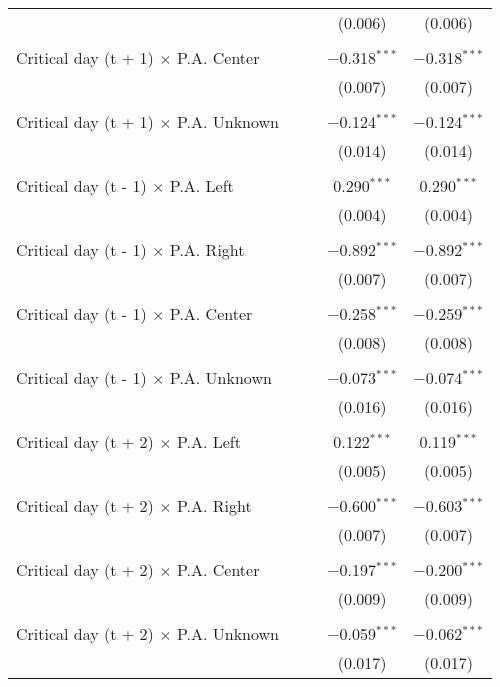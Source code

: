 \documentclass[
]{article}
\begin{document}
\begin{table}[!htbp]
{\begin{tabular}{@{\extracolsep{5pt}}lcccc}
  &  &  & (0.006) & (0.006) \\ 
  & & & & \\ 
 Critical day (t + 1) $\times$ P.A. Center &  &  & $-$0.318$^{***}$ & $-$0.318$^{***}$ \\ 
  &  &  & (0.007) & (0.007) \\ 
  & & & & \\ 
 Critical day (t + 1) $\times$ P.A. Unknown &  &  & $-$0.124$^{***}$ & $-$0.124$^{***}$ \\ 
  &  &  & (0.014) & (0.014) \\ 
  & & & & \\ 
 Critical day (t - 1) $\times$ P.A. Left &  &  & 0.290$^{***}$ & 0.290$^{***}$ \\ 
  &  &  & (0.004) & (0.004) \\ 
  & & & & \\ 
 Critical day (t - 1) $\times$ P.A. Right &  &  & $-$0.892$^{***}$ & $-$0.892$^{***}$ \\ 
  &  &  & (0.007) & (0.007) \\ 
  & & & & \\ 
 Critical day (t - 1) $\times$ P.A. Center &  &  & $-$0.258$^{***}$ & $-$0.259$^{***}$ \\ 
  &  &  & (0.008) & (0.008) \\ 
  & & & & \\ 
 Critical day (t - 1) $\times$ P.A. Unknown &  &  & $-$0.073$^{***}$ & $-$0.074$^{***}$ \\ 
  &  &  & (0.016) & (0.016) \\ 
  & & & & \\ 
 Critical day (t + 2) $\times$ P.A. Left &  &  & 0.122$^{***}$ & 0.119$^{***}$ \\ 
  &  &  & (0.005) & (0.005) \\ 
  & & & & \\ 
 Critical day (t + 2) $\times$ P.A. Right &  &  & $-$0.600$^{***}$ & $-$0.603$^{***}$ \\ 
  &  &  & (0.007) & (0.007) \\ 
  & & & & \\ 
 Critical day (t + 2) $\times$ P.A. Center &  &  & $-$0.197$^{***}$ & $-$0.200$^{***}$ \\ 
  &  &  & (0.009) & (0.009) \\ 
  & & & & \\ 
 Critical day (t + 2) $\times$ P.A. Unknown &  &  & $-$0.059$^{***}$ & $-$0.062$^{***}$ \\ 
  &  &  & (0.017) & (0.017) \\ 

\end{tabular}}
\end{table}
\end{document}
